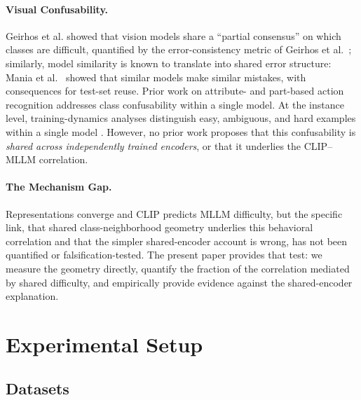 \documentclass[a4paper,fleqn]{cas-sc}
\begin{document}
\paragraph{Visual Confusability.}
Geirhos et al. \cite{geirhos2021partial} showed that vision models share a ``partial consensus'' on which classes are difficult, quantified by the error-consistency metric of Geirhos et al.~\cite{geirhos2020error}; similarly, model similarity is known to translate into shared error structure: Mania et al.~\cite{mania2019model} showed that similar models make similar mistakes, with consequences for test-set reuse. Prior work on attribute- and part-based action recognition \cite{yao2011stanford40} addresses class confusability within a single model. At the instance level, training-dynamics analyses distinguish easy, ambiguous, and hard examples within a single model \cite{swayamdipta2020cartography}. However, no prior work proposes that this confusability is \emph{shared across independently trained encoders}, or that it underlies the CLIP--MLLM correlation.

\paragraph{The Mechanism Gap.}
Representations converge and CLIP predicts MLLM difficulty, but the specific link, that shared class-neighborhood geometry underlies this behavioral correlation and that the simpler shared-encoder account is wrong, has not been quantified or falsification-tested. The present paper provides that test: we measure the geometry directly, quantify the fraction of the correlation mediated by shared difficulty, and empirically provide evidence against the shared-encoder explanation.

\section{Experimental Setup}
\label{sec:setup}

\subsection{Datasets}
\end{document}
